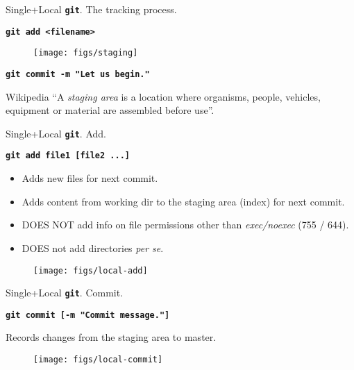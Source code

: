 \documentclass{beamer}
\newcommand{\git}{\texttt{\textbf{git}}\xspace}
\begin{document}
\begin{frame}{Single+Local \git. The tracking process.}
  \begin{center}
    \texttt{\textbf{git add <filename>}}
  \end{center}
  \begin{figure}
    \centering
    \texttt{[image: figs/staging]}
  \end{figure}
  \begin{center}
    \texttt{\textbf{git commit -m "Let us begin."}}
  \end{center}

  \begin{block}{Wikipedia}
    ``A \emph{staging area} is a location where organisms, people,
    vehicles, equipment or material are assembled before use''.
  \end{block}
\end{frame}

\begin{frame}{Single+Local \git. Add.}
  \begin{center}
    \texttt{\textbf{git add file1 [file2 ...]}}
  \end{center}
  \begin{itemize}
  \item Adds new files for next commit.
  \item Adds content from working dir to the staging area (index) for
    next commit.
  \item DOES NOT add info on file permissions other than \emph{exec/noexec}
    (755 / 644).
  \item DOES not add directories \emph{per se}.
  \end{itemize}
  \begin{figure}
    \centering
    \texttt{[image: figs/local-add]}
  \end{figure}
\end{frame}

\begin{frame}{Single+Local \git. Commit.}
  \begin{center}
    \texttt{\textbf{git commit [-m "Commit message."]}}
  \end{center}
  Records changes from the staging area to master.
  \begin{figure}
    \centering
    \texttt{[image: figs/local-commit]}
  \end{figure}
\end{frame}
\end{document}
